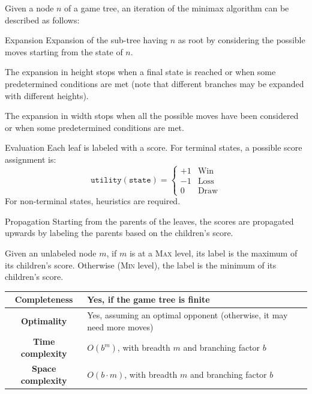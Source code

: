 Given a node $n$ of a game tree,
an iteration of the minimax algorithm can be described as follows:
\begin{descriptionlist}
    \item[Expansion] 
        Expansion of the sub-tree having $n$ as root by considering the possible moves starting from the state of $n$.
        
        The expansion in height stops when a final state is reached or when some predetermined conditions are met 
        (note that different branches may be expanded with different heights).

        The expansion in width stops when all the possible moves have been considered or when some predetermined conditions are met.

    \item[Evaluation]
        Each leaf is labeled with a score.
        For terminal states, a possible score assignment is:
        \[ \texttt{utility}(\texttt{state}) = \begin{cases}
            +1 & \text{Win} \\
            -1 & \text{Loss} \\
            0 & \text{Draw}
        \end{cases} \]
        For non-terminal states, heuristics are required.

    \item[Propagation]
        Starting from the parents of the leaves, the scores are propagated upwards 
        by labeling the parents based on the children's score.

        Given an unlabeled node $m$, if $m$ is at a \textsc{Max} level, its label is the maximum of its children's score.
        Otherwise (\textsc{Min} level), the label is the minimum of its children's score.
\end{descriptionlist}


\begin{center}
    \def\arraystretch{1.2}
    \begin{tabular}{c | m{10cm}}
        \hline
        \textbf{Completeness} & Yes, if the game tree is finite \\
        \hline
        \textbf{Optimality} & Yes, assuming an optimal opponent (otherwise, it may need more moves) \\
        \hline
        \textbf{Time complexity}
            & $O(b^m)$, with breadth $m$ and branching factor $b$ \\
        \hline
        \textbf{Space complexity}
            & $O(b \cdot m)$, with breadth $m$ and branching factor $b$ \\
        \hline
    \end{tabular}
\end{center}

